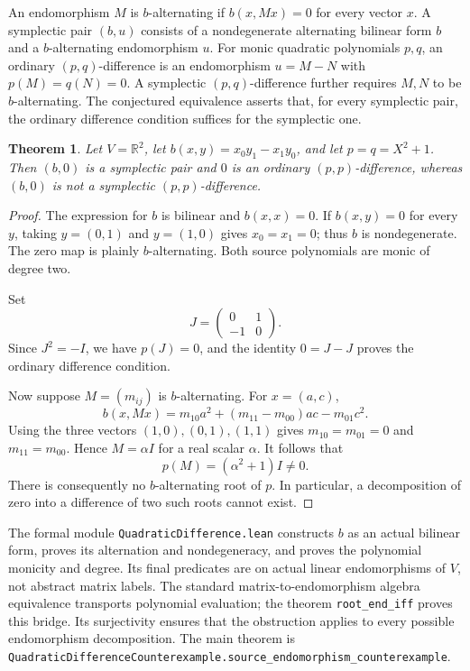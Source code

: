 \documentclass[11pt]{article}
\newtheorem{theorem}{Theorem}
\begin{document}
An endomorphism $M$ is $b$-alternating if $b(x,Mx)=0$ for every vector $x$. A symplectic pair $(b,u)$ consists of a nondegenerate alternating bilinear form $b$ and a $b$-alternating endomorphism $u$. For monic quadratic polynomials $p,q$, an ordinary $(p,q)$-difference is an endomorphism $u=M-N$ with $p(M)=q(N)=0$. A symplectic $(p,q)$-difference further requires $M,N$ to be $b$-alternating. The conjectured equivalence asserts that, for every symplectic pair, the ordinary difference condition suffices for the symplectic one.
\begin{theorem}
Let $V=\mathbb R^2$, let $b(x,y)=x_0y_1-x_1y_0$, and let $p=q=X^2+1$. Then $(b,0)$ is a symplectic pair and $0$ is an ordinary $(p,p)$-difference, whereas $(b,0)$ is not a symplectic $(p,p)$-difference.
\end{theorem}
\begin{proof}
The expression for $b$ is bilinear and $b(x,x)=0$. If $b(x,y)=0$ for every $y$, taking $y=(0,1)$ and $y=(1,0)$ gives $x_0=x_1=0$; thus $b$ is nondegenerate. The zero map is plainly $b$-alternating. Both source polynomials are monic of degree two.

Set
\[
 J=\begin{pmatrix}0&1\\-1&0\end{pmatrix}.
\]
Since $J^2=-I$, we have $p(J)=0$, and the identity $0=J-J$ proves the ordinary difference condition.

Now suppose $M=(m_{ij})$ is $b$-alternating. For $x=(a,c)$,
\[
 b(x,Mx)=m_{10}a^2+(m_{11}-m_{00})ac-m_{01}c^2.
\]
Using the three vectors $(1,0),(0,1),(1,1)$ gives
$m_{10}=m_{01}=0$ and $m_{11}=m_{00}$. Hence $M=\alpha I$ for a real scalar $\alpha$. It follows that
\[
 p(M)=(\alpha^2+1)I\ne0.
\]
There is consequently no $b$-alternating root of $p$. In particular, a decomposition of zero into a difference of two such roots cannot exist.
\end{proof}
The formal module \texttt{QuadraticDifference.lean} constructs $b$ as an actual bilinear form, proves its alternation and nondegeneracy, and proves the polynomial monicity and degree. Its final predicates are on actual linear endomorphisms of $V$, not abstract matrix labels. The standard matrix-to-endomorphism algebra equivalence transports polynomial evaluation; the theorem \texttt{root\_end\_iff} proves this bridge. Its surjectivity ensures that the obstruction applies to every possible endomorphism decomposition. The main theorem is \texttt{QuadraticDifferenceCounterexample.source\_endomorphism\_counterexample}.
\end{document}
